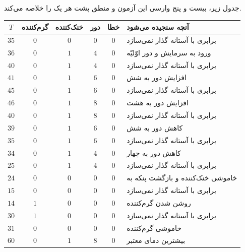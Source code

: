 \documentclass[12pt,a4paper]{article}
\begin{document}

	جدول زیر، بیست و پنج وارسی این آزمون و منطق پشت هر یک را خلاصه می‌کند.

	\begin{table}[H]
		\centering
		\footnotesize
		\begin{tabular}{|c|c|c|c|c|l|}
			\hline
			\(T\) & \textbf{گرم‌کننده} & \textbf{خنک‌کننده} & \textbf{دور} & \textbf{خطا} & \textbf{آنچه سنجیده می‌شود} \\ \hline
			\(35\)  & \(0\) & \(0\) & \(0\) & \(0\) & برابری با آستانه گذار نمی‌سازد \\ \hline
			\(36\)  & \(0\) & \(1\) & \(4\) & \(0\) & ورود به سرمایش و دور اوّلیّه \\ \hline
			\(40\)  & \(0\) & \(1\) & \(4\) & \(0\) & برابری با آستانه گذار نمی‌سازد \\ \hline
			\(41\)  & \(0\) & \(1\) & \(6\) & \(0\) & افزایش دور به شش \\ \hline
			\(45\)  & \(0\) & \(1\) & \(6\) & \(0\) & برابری با آستانه گذار نمی‌سازد \\ \hline
			\(46\)  & \(0\) & \(1\) & \(8\) & \(0\) & افزایش دور به هشت \\ \hline
			\(40\)  & \(0\) & \(1\) & \(8\) & \(0\) & برابری با آستانه گذار نمی‌سازد \\ \hline
			\(39\)  & \(0\) & \(1\) & \(6\) & \(0\) & کاهش دور به شش \\ \hline
			\(35\)  & \(0\) & \(1\) & \(6\) & \(0\) & برابری با آستانه گذار نمی‌سازد \\ \hline
			\(34\)  & \(0\) & \(1\) & \(4\) & \(0\) & کاهش دور به چهار \\ \hline
			\(25\)  & \(0\) & \(1\) & \(4\) & \(0\) & برابری با آستانه گذار نمی‌سازد \\ \hline
			\(24\)  & \(0\) & \(0\) & \(0\) & \(0\) & خاموشی خنک‌کننده و بازگشت پنکه به \lr{OUT} \\ \hline
			\(15\)  & \(0\) & \(0\) & \(0\) & \(0\) & برابری با آستانه گذار نمی‌سازد \\ \hline
			\(14\)  & \(1\) & \(0\) & \(0\) & \(0\) & روشن شدن گرم‌کننده \\ \hline
			\(30\)  & \(1\) & \(0\) & \(0\) & \(0\) & برابری با آستانه گذار نمی‌سازد \\ \hline
			\(31\)  & \(0\) & \(0\) & \(0\) & \(0\) & خاموشی گرم‌کننده \\ \hline
			\(60\)  & \(0\) & \(1\) & \(8\) & \(0\) & بیشترین دمای معتبر \\ \hline

\end{tabular}
\end{table}
\end{document}
